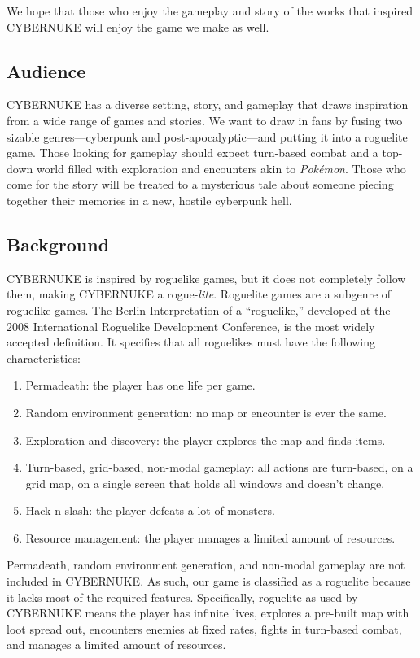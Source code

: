 \documentclass[10pt,conference,onecolumn,compsoc]{IEEEtran}
\begin{document}
We hope that those who enjoy the gameplay and story of the works that inspired CYBERNUKE will enjoy the game we make as well.

\subsection{Audience}
CYBERNUKE has a diverse setting, story, and gameplay that draws inspiration from a wide range of games and stories. We want to draw in fans by fusing two sizable genres—cyberpunk and post-apocalyptic—and putting it into a roguelite game. Those looking for gameplay should expect turn-based combat and a top-down world filled with exploration and encounters akin to \emph{Pokémon}. Those who come for the story will be treated to a mysterious tale about someone piecing together their memories in a new, hostile cyberpunk hell. 

\pagebreak
\subsection{Background}
CYBERNUKE is inspired by roguelike games, but it does not completely follow them, making CYBERNUKE a rogue-\emph{lite}. Roguelite games are a subgenre of roguelike games. The Berlin Interpretation of a “roguelike,” developed at the 2008 International Roguelike Development Conference, is the most widely accepted definition. It specifies that all roguelikes must have the following characteristics\cite{IEEEhowto:roguelite_2}:
\begin{enumerate}
\item Permadeath: the player has one life per game.
\item Random environment generation: no map or encounter is ever the same.
\item Exploration and discovery: the player explores the map and finds items.
\item Turn-based, grid-based, non-modal gameplay: all actions are turn-based, on a grid map, on a single screen that holds all windows and doesn't change.
\item Hack-n-slash: the player defeats a lot of monsters.
\item Resource management: the player manages a limited amount of resources.
\end{enumerate}
Permadeath, random environment generation, and non-modal gameplay are not included in CYBERNUKE. As such, our game is classified as a roguelite because it lacks most of the required features. Specifically, roguelite as used by CYBERNUKE means the player has infinite lives, explores a pre-built map with loot spread out, encounters enemies at fixed rates, fights in turn-based combat, and manages a limited amount of resources.
\end{document}
